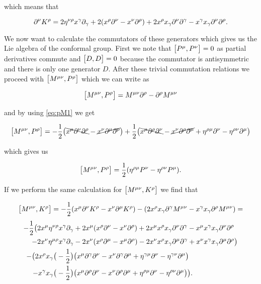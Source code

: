 which means that 

\begin{equation} \label{eq:pM2}
    \partial^\nu K^\rho=
    2\eta^{\nu \rho}x^\gamma \partial_\gamma
    + 2(x^\rho \partial^\nu-x^\nu\partial^\rho)
    + 2x^\rho x_\gamma \partial^\nu \partial^\gamma
    - x^\gamma x_\gamma \partial^\nu \partial^\rho.
\end{equation}

We now want to calculate the commutators of these generators which gives us the Lie algebra of the conformal group. First we note that $\big[P^\mu, P^\nu\big]=0$ as partial derivatives commute and $\big[D, D\big]=0$ because the commutator is antisymmetric and there is only one generator $D$. After these trivial commutation relations we proceed with $\big[M^{\mu \nu}, P^\rho\big]$ which we can write as

    $$\big[M^{\mu \nu}, P^\rho\big]=
    M^{\mu \nu}\partial^\rho
    -\partial^\rho M^{\mu \nu}
    $$

and by using \ref{eq:pM1} we get

    $$
    \big[M^{\mu \nu}, P^\rho\big]=
    -\frac{1}{2}\big(
        \bcancel{x^\mu\partial^\nu\partial^\rho}
        -\cancel{x^\nu\partial^\mu\partial^\rho}\big)
    +\frac{1}{2}\big( \bcancel{x^\mu \partial ^\rho \partial^\nu} 
        -\cancel{x^\nu \partial ^\rho \partial^\mu}
        +\eta^{\rho \mu} \partial^\nu
        -\eta^{\rho \nu} \partial^\mu \big)
    $$
    
which gives us

\begin{equation}
\big[M^{\mu \nu}, P^\rho\big]= 
    \frac{1}{2}(
        \eta^{\rho \mu} P^\nu
        -\eta^{\rho \nu} P^\mu).
\end{equation}

If we perform the same calculation for $\big[M^{\mu \nu}, K^\rho\big]$ we find that

    $$\big[M^{\mu \nu}, K^\rho\big]=
    -\frac{1}{2}(x^\mu\partial^\nu K^\rho
        -x^\nu\partial^\mu K^\rho)
    -(2x^\rho x_\gamma \partial^\gamma M^{\mu \nu}-
        x^\gamma x_\gamma \partial^\rho M^{\mu \nu})=$$
\begin{align*}
    -\frac{1}{2}\big(
    2x^\mu \eta^{\nu \rho}x^\gamma \partial_\gamma&
        + 2 x^\mu (
            x^\rho \partial^\nu
            -x^\nu\partial^\rho)
        + 2x^\mu x^\rho x_\gamma \partial^\nu \partial^\gamma
        - x^\mu x^\gamma x_\gamma \partial^\nu \partial^\rho
        \\
        -2x^\nu \eta^{\mu \rho}x^\gamma \partial_\gamma&
        - 2 x^\nu (
            x^\rho \partial^\mu
            -x^\mu\partial^\rho)
        - 2x^\nu x^\rho x_\gamma \partial^\mu \partial^\gamma
        + x^\nu x^\gamma x_\gamma \partial^\mu \partial^\rho\big)
        \\
    -\big(
        2x^\rho x_\gamma
        \big(-\frac{1}{2}\big)& \big(
            x^\mu \partial ^\gamma \partial^\nu 
            -x^\nu \partial ^\gamma \partial^\mu
    +\eta^{\gamma \mu} \partial^\nu
    -\eta^{\gamma \nu} \partial^\mu \big)
    \\
    -x^\gamma x_\gamma 
    \big(-\frac{1}{2}\big)&\big(
        x^\mu \partial ^\rho \partial^\nu 
        -x^\nu \partial ^\rho \partial^\mu
        +\eta^{\rho \mu} \partial^\nu
        -\eta^{\rho \nu} \partial^\mu \big)\big).
\end{align*}

